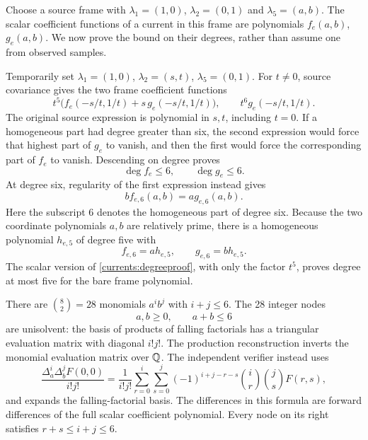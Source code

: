 Choose a source frame with $\lambda_1=(1,0)$,
$\lambda_2=(0,1)$ and $\lambda_5=(a,b)$. The scalar coefficient
functions of a current in this frame are polynomials $f_e(a,b)$,
$g_e(a,b)$. We now prove the bound on their degrees, rather than
assume one from observed samples.

Temporarily set $\lambda_1=(1,0)$, $\lambda_2=(s,t)$,
$\lambda_5=(0,1)$. For $t\ne0$, source covariance gives the two
frame coefficient functions
\begin{equation}
 t^5\bigl(f_e(-s/t,1/t)+s\,g_e(-s/t,1/t)\bigr),\qquad
 t^6g_e(-s/t,1/t).
 \label{currents:degreeproof}
\end{equation}
The original source expression is polynomial in $s,t$, including
$t=0$. If a homogeneous part had degree greater than six, the second
expression would force that highest part of $g_e$ to vanish, and then
the first would force the corresponding part of $f_e$ to vanish.
Descending on degree proves
\begin{equation}
 \deg f_e\le6,\qquad \deg g_e\le6.
 \label{currents:degree}
\end{equation}
At degree six, regularity of the first expression instead gives
\begin{equation}
 b f_{e,6}(a,b)=a g_{e,6}(a,b).
 \label{currents:syzygy}
\end{equation}
Here the subscript $6$ denotes the homogeneous part of degree six.
Because the two coordinate polynomials $a,b$ are relatively prime,
there is a homogeneous polynomial $h_{e,5}$ of degree five with
\begin{equation}
 f_{e,6}=a h_{e,5},\qquad g_{e,6}=b h_{e,5}.
 \label{currents:high}
\end{equation}
The scalar version of \eqref{currents:degreeproof}, with only the
factor $t^5$, proves degree at most five for the bare frame polynomial.

There are $\binom{8}{2}=28$ monomials $a^i b^j$ with $i+j\le6$.
The 28 integer nodes
\begin{equation}
 a,b\ge0,\qquad a+b\le6
 \label{currents:nodes}
\end{equation}
are unisolvent: the basis of products of falling factorials has a
triangular evaluation matrix with diagonal $i!j!$. The production
reconstruction inverts the monomial evaluation matrix over $\mathbb{Q}$.
The independent verifier instead uses
\begin{equation}
 \frac{\Delta_a^i\Delta_b^j F(0,0)}{i!j!}
 =\frac1{i!j!}\sum_{r=0}^{i}\sum_{s=0}^{j}
 (-1)^{i+j-r-s}\binom{i}{r}\binom{j}{s}F(r,s),
 \label{currents:newton}
\end{equation}
and expands the falling-factorial basis. The differences in this
formula are forward differences of the full scalar coefficient
polynomial. Every node on its right satisfies $r+s\le i+j\le6$.

